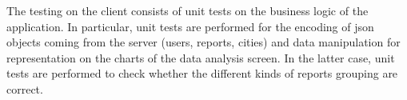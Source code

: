 The testing on the client consists of unit tests on the business logic of the application. In particular, unit tests are performed for the encoding of json objects coming from the server (users, reports, cities) and data manipulation for representation on the charts of the data analysis screen. In the latter case, unit tests are performed to check whether the different kinds of reports grouping are correct.